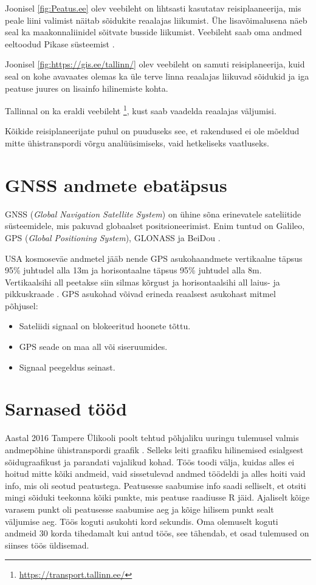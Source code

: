Joonisel \ref{fig:Peatus.ee} olev veebileht  on lihtsasti kasutatav reisiplaaneerija, mis peale liini valimist näitab sõidukite reaalajas liikumist. Ühe lisavõimalusena näeb seal ka maakonnaliinidel sõitvate busside liikumist. Veebileht saab oma andmed eeltoodud Pikase süsteemist \cite{tallinn_infosusteem_2017}.


Joonisel \ref{fig:https://gis.ee/tallinn/} olev veebileht on samuti reisiplaneerija, kuid seal on kohe avavaates olemas ka üle terve linna reaalajas liikuvad sõidukid ja iga peatuse juures on lisainfo hilinemiste kohta.

Tallinnal on ka eraldi veebileht \footnote{\url{https://transport.tallinn.ee/}}, kust saab vaadelda reaalajas väljumisi. 

Kõikide reisiplaneerijate puhul on puuduseks see, et rakendused ei ole mõeldud mitte ühistranspordi võrgu analüüsimiseks, vaid hetkeliseks vaatluseks.


\section{GNSS andmete ebatäpsus}

GNSS (\textit{Global Navigation Satellite System}) on ühine sõna erinevatele sateliitide süsteemidele, mis pakuvad globaalset positsioneerimist. Enim tuntud on Galileo, GPS (\textit{Global Positioning System}), GLONASS ja BeiDou \cite{euspa_gnss}. 

USA kosmoseväe andmetel jääb nende GPS asukohaandmete vertikaalne täpsus 95\% juhtudel alla 13m ja horisontaalne täpsus 95\% juhtudel alla 8m. Vertikaalsihi all peetakse siin silmas kõrgust ja horisontaalsihi all laius- ja pikkuskraade \cite{GPS_performance}. 
GPS asukohad võivad erineda reaalsest asukohast mitmel põhjusel:
\begin{itemize}
    \item Sateliidi signaal on blokeeritud hoonete tõttu.
    \item GPS seade on maa all või siseruumides.
    \item Signaal peegeldus seinast.
\end{itemize}

\section{Sarnased tööd}

Aastal 2016  Tampere Ülikooli poolt tehtud põhjaliku uuringu tulemusel valmis andmepõhine ühistranspordi graafik \cite{Syrjarinne2015}. Selleks leiti graafiku hilinemised esialgsest sõidugraafikust ja parandati vajalikud kohad. Töös toodi välja, kuidas alles ei hoitud mitte kõiki andmeid, vaid sissetulevad andmed töödeldi ja alles hoiti vaid info, mis oli seotud peatustega. Peatusesse saabumise info saadi selliselt, et otsiti mingi sõiduki teekonna kõiki punkte, mis peatuse raadiusse R jäid. Ajaliselt kõige varasem punkt oli peatusesse saabumise aeg ja kõige hilisem punkt sealt väljumise aeg. Töös koguti asukohti kord sekundis. Oma olemuselt koguti andmeid 30 korda tihedamalt kui antud töös, see tähendab, et osad tulemused on siinses töös üldisemad.

